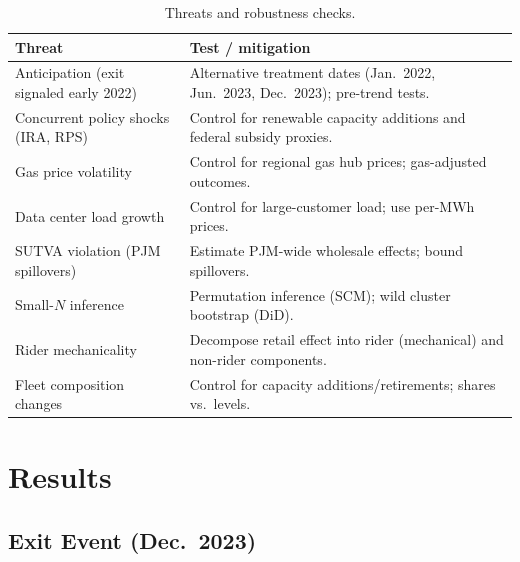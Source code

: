 \documentclass[12pt]{article}
\begin{document}
\begin{table}[H]
\centering
\caption{Threats and robustness checks.}
\label{tab:threats}
\begin{threeparttable}
\begin{tabular}{@{}p{5.4cm}p{8.0cm}@{}}
\toprule
Threat & Test / mitigation \\
\midrule
Anticipation (exit signaled early 2022) & Alternative treatment dates (Jan.\ 2022, Jun.\ 2023, Dec.\ 2023); pre-trend tests. \\
Concurrent policy shocks (IRA, RPS) & Control for renewable capacity additions and federal subsidy proxies. \\
Gas price volatility & Control for regional gas hub prices; gas-adjusted outcomes. \\
Data center load growth & Control for large-customer load; use per-MWh prices. \\
SUTVA violation (PJM spillovers) & Estimate PJM-wide wholesale effects; bound spillovers. \\
Small-$N$ inference & Permutation inference (SCM); wild cluster bootstrap (DiD). \\
Rider mechanicality & Decompose retail effect into rider (mechanical) and non-rider components. \\
Fleet composition changes & Control for capacity additions/retirements; shares vs.\ levels. \\
\bottomrule
\end{tabular}
\end{threeparttable}
\end{table}

\section{Results}\label{sec:results}

\subsection{Exit Event (Dec.\ 2023)}\label{sec:res-exit}
% 
\end{document}
